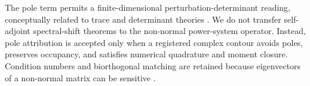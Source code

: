 The pole term permits a finite-dimensional perturbation-determinant reading,
conceptually related to trace and determinant theories
\cite{krein1953trace,simon1977determinants}. We do not transfer
self-adjoint spectral-shift theorems to the non-normal power-system operator.
Instead, pole attribution is accepted only when a registered complex contour
avoids poles, preserves occupancy, and satisfies numerical quadrature and
moment closure. Condition numbers and biorthogonal matching are retained
because eigenvectors of a non-normal matrix can be sensitive
\cite{trefethen1997pseudospectra}.
